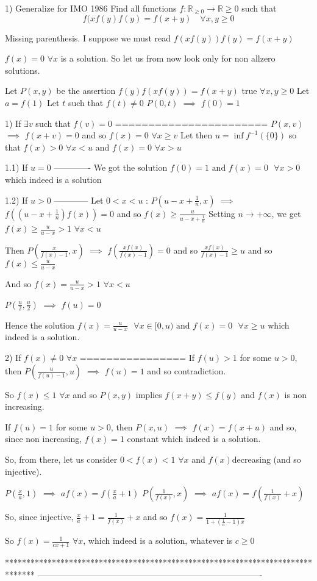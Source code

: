 \begin{solution}
	\begin{tcolorbox}1) Generalize for IMO 1986
Find all functions $f:\mathbb{R}_{\geq 0}\to\mathbb{R}{\geq 0}$ such that 
\[f(xf(y)f(y)=f(x+y) \quad  \forall x,y\geq 0\]\end{tcolorbox}
Missing parenthesis. I suppose we must read $f(xf(y))f(y)=f(x+y)$

$\boxed {f(x)=0}$ $\forall x$ is a solution. So let us from now look only for non allzero solutions.

Let $P(x,y)$ be the assertion $f(y)f(xf(y))=f(x+y)$ true $\forall x,y\ge 0$
Let $a=f(1)$
Let $t$ such that $f(t)\ne 0$
$P(0,t)$ $\implies$ $f(0)=1$

1) If $\exists v$ such that $f(v)=0$
=======================
$P(x,v)$ $\implies$ $f(x+v)=0$ and so $f(x)=0$ $\forall x\ge v$
Let then $u=\inf f^{-1}(\{0\})$ so that $f(x)>0$ $\forall x<u$ and $f(x)=0$ $\forall x>u$

1.1) If $u=0$
-------------
We got the solution $\boxed{f(0)=1\text{  and  }f(x)=0\text{   }\forall x>0}$ which indeed is a solution

1.2) If $u>0$
------------
Let $0<x<u$ : $P(u-x+\frac 1n,x)$ $\implies$ $f((u-x+\frac 1n)f(x))=0$ and so $f(x)\ge \frac u{u-x+\frac 1n}$
Setting $n\to+\infty$, we get $f(x)\ge\frac u{u-x}>1$ $\forall x<u$

Then $P(\frac x{f(x)-1},x)$ $\implies$ $f(\frac {xf(x)}{f(x)-1})=0$ and so $\frac {xf(x)}{f(x)-1}\ge u$ and so $f(x)\le \frac u{u-x}$

And so $f(x)=\frac u{u-x}>1$ $\forall x<u$

$P(\frac u2,\frac u2)$ $\implies$ $f(u)=0$

Hence the solution $\boxed{f(x)=\frac u{u-x}\text{   }\forall x\in[0,u)\text{  and  }f(x)=0\text{  }\forall x\ge u}$ which indeed is a solution.

2) If $f(x)\ne 0$ $\forall x$
================
If $f(u)>1$ for some $u>0$, then $P(\frac u{f(u)-1},u)$ $\implies$ $f(u)=1$ and so contradiction.

So $f(x)\le 1$ $\forall x$ and so $P(x,y)$ implies $f(x+y)\le f(y)$ and $f(x)$ is non increasing.

If $f(u)=1$ for some $u>0$, then $P(x,u)$ $\implies$ $f(x)=f(x+u)$ and so, since non increasing, $\boxed{f(x)=1}$ constant which indeed is a solution.

So, from there, let us consider $0<f(x)<1$ $\forall x$ and $f(x)$decreasing (and so injective).

$P(\frac xa,1)$ $\implies$ $af(x)=f(\frac xa+1)$ 
$P(\frac 1{f(x)},x)$ $\implies$ $af(x)=f(\frac 1{f(x)}+x)$ 

So, since injective, $\frac xa+1=\frac 1{f(x)}+x$ and so $f(x)=\frac 1{1+(\frac 1a-1)x}$

So $\boxed{f(x)=\frac 1{cx+1}}$ $\forall x$, which indeed is a solution, whatever is $c\ge 0$
\end{solution}
*******************************************************************************
-------------------------------------------------------------------------------

